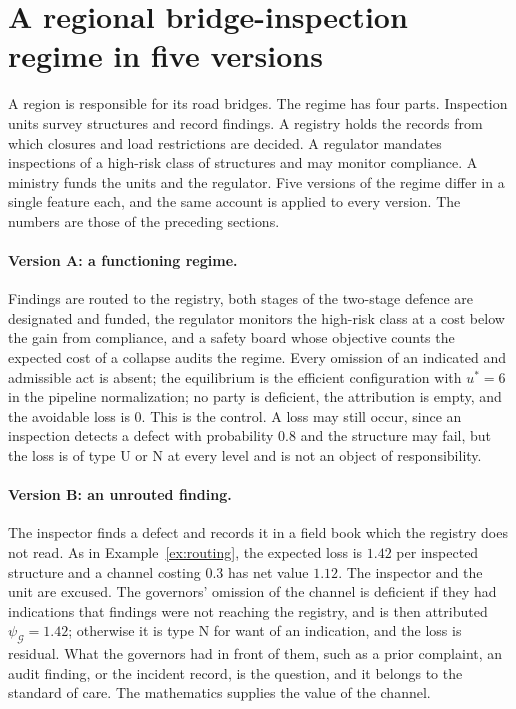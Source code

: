 \documentclass[11pt]{article}
\theoremstyle{plain}
\theoremstyle{definition}
\begin{document}
\section{A regional bridge-inspection regime in five versions}\label{sec:worked}

A region is responsible for its road bridges. The regime has four parts. Inspection units survey structures and record findings. A registry holds the records from which closures and load restrictions are decided. A regulator mandates inspections of a high-risk class of structures and may monitor compliance. A ministry funds the units and the regulator. Five versions of the regime differ in a single feature each, and the same account is applied to every version. The numbers are those of the preceding sections.

\paragraph{Version A: a functioning regime.} Findings are routed to the registry, both stages of the two-stage defence are designated and funded, the regulator monitors the high-risk class at a cost below the gain from compliance, and a safety board whose objective counts the expected cost of a collapse audits the regime. Every omission of an indicated and admissible act is absent; the equilibrium is the efficient configuration with $u^*=6$ in the pipeline normalization; no party is deficient, the attribution is empty, and the avoidable loss is $0$. This is the control. A loss may still occur, since an inspection detects a defect with probability $0.8$ and the structure may fail, but the loss is of type U or N at every level and is not an object of responsibility.

\paragraph{Version B: an unrouted finding.} The inspector finds a defect and records it in a field book which the registry does not read. As in Example~\ref{ex:routing}, the expected loss is $1.42$ per inspected structure and a channel costing $0.3$ has net value $1.12$. The inspector and the unit are excused. The governors' omission of the channel is deficient if they had indications that findings were not reaching the registry, and is then attributed $\psi_{\mathcal G}=1.42$; otherwise it is type N for want of an indication, and the loss is residual. What the governors had in front of them, such as a prior complaint, an audit finding, or the incident record, is the question, and it belongs to the standard of care. The mathematics supplies the value of the channel.
\end{document}
